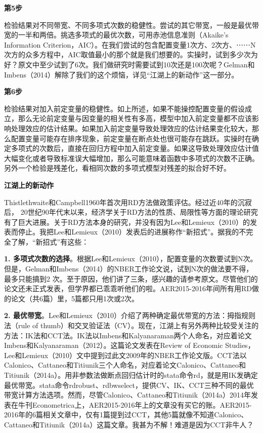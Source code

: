 \documentclass[cn,10pt,math=newtx,citestyle=gb7714-2015,bibstyle=gb7714-2015]{elegantbook}
\begin{document}
	\textbf{第5步}
	
	检验结果对不同带宽、不同多项式次数的稳健性。尝试的其它带宽，一般是最优带宽的一半和两倍。挑选多项式的最优次数，可用赤池信息准则（Akaike's Information Criterion，AIC）。在我们尝试的包含配置变量1次方、2次方、⋯⋯N次方的众多方程中，AIC取值最小的那个就是我们想要的。实操时，试到多少次为好？原文中至少试到了6次。我们做研究时需要试到10次还是100次呢？Gelman和Imbens（2014）解除了我们的这个烦恼，详见“江湖上的新动作”这一部分。
	
	\textbf{第6步}
	
	检验结果对加入前定变量的稳健性。如上所述，如果不能操控配置变量的假设成立，那么无论前定变量与因变量的相关性有多高，模型中加入前定变量都不应该影响处理效应的估计结果。如果加入前定变量导致处理效应的估计结果变化较大，那么配置变量可能存在排序现象，前定变量在断点处也很可能存在跳跃。实操时在确定多项式的次数后，直接在回归方程中加入前定变量。如果这导致处理效应估计值大幅变化或者导致标准误大幅增加，那么可能意味着函数中多项式的次数不正确。另外一个检验是残差化，看相同次数的多项式模型对残差的拟合好不好。
	
	\textbf{江湖上的新动作}
	
	Thistlethwaite和Campbell1960年首次用RD方法做政策评估。经过近40年的沉寂后， 20世纪90年代末以来，经济学关于RD方法的性质、局限性等方面的理论研究有了巨大进展。关于RD方法本身的研究，并没有因为Lee和Lemieux（2010）的发表而停止。我把Lee和Lemieux（2010）发表后的进展称作“新招式”。据我的不完全了解，“新招式”有这些：
	
	\textbf{1. 多项式次数的选择}。根据Lee和Lemieux（2010），配置变量的次数要试到N次。但是，Gelman和Imbens（2014）的NBER工作论文说，试到N次的做法要不得，最多只能搞到2 次。至于原因，他们讲了三条，感兴趣的请参考原文。尽管他们的论文还未正式发表，但学界都已乖乖听他们的啦。AER2015-2016年间所有用RD做的论文（共6篇）里，5篇都只用1次或2次。
	
	\textbf{2. 最优带宽}。Lee和Lemieux（2010）介绍了两种确定最优带宽的方法：拇指规则法（rule of thumb）和交叉验证法（CV）。现在，江湖上有另外两种比较受关注的方法：IK法和CCT法。IK法以Imbens和Kalyanaraman两个人命名，对应着论文Imbens和Kalyanaraman（2012）。这篇论文发表在Review of Economic Studies，Lee和Lemieux（2010）文中提到过此文2009年的NBER工作论文版。CCT法以Calonico、Cattaneo和Titiunik三个人命名，对应着论文Calonico、Cattaneo和Titiunik（2014a）。用非参数法做断点回归估计时的stata命令rd，就是用IK发确定最优带宽。stata命令rdrobust、rdbwselect，提供CV、IK、CCT三种不同的最优带宽计算方法选项。然而，尽管Calonico、Cattaneo和Titiunik（2014a）2014年发表在牛刊Econometrica上，AER2015-2016年上的文章没有买它的账。AER2015-2016年的6篇相关文章中，仅有1篇提到过CCT，其他5篇就像不知道Calonico、Cattaneo和Titiunik（2014a）这篇文章。我甚为不解！难道是因为CCT非牛人？
	
\end{document}
